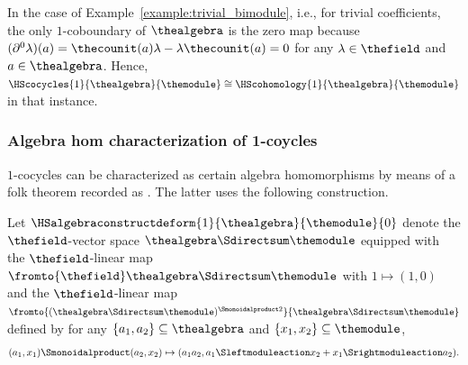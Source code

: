 \documentclass[pdftex]{sigma}
\numberwithin{equation}{section}
\begin{document}
{\begin{Example}
  \label{remark:trivial_bimodule}
  \newcommand{\anyscalar}{\lambda}
  \newcommand{\anyop}{a}
  In the case of Example~\ref{example:trivial_bimodule}, i.e., for trivial coefficients, the only $1$-coboundary of $\thealgebra$ is the zero map because $(\partial^0\anyscalar)(\anyop)=\thecounit(\anyop)\anyscalar-\anyscalar\thecounit(\anyop)=0$ for any $\anyscalar\in\thefield$ and $\anyop\in\thealgebra$. Hence,  $\HScocycles{1}{\thealgebra}{\themodule}\cong\HScohomology{1}{\thealgebra}{\themodule}$ in that instance.
\end{Example}
\subsubsection{Algebra hom characterization of 1-coycles}
\label{section:hochschild-general-algebrahoms}
$1$-cocycles can be characterized as certain algebra homomorphisms by means of  a folk theorem recorded as  \cite[Lemma~1.9]{KyedRaum2017}. The latter uses the following construction.

{
    \newcommand{\thedeform}{c}
  \newcommand{\thedeformxx}[2]{c(#1 \Smonoidalproduct #2)}
  \newcommand{\thirda}{a_3}
        \newcommand{\firsta}{a_1}
      \newcommand{\firstx}{x_1}
      \newcommand{\seconda}{a_2}
      \newcommand{\secondx}{x_2}
      \begin{Definition}
        \label{definition:the-bfg-algebra}
    Let $\HSalgebraconstructdeform{1}{\thealgebra}{\themodule}{0}$ denote the  $\thefield$-vector space $\thealgebra\Sdirectsum\themodule$ equipped with the $\thefield$-linear map $\fromto{\thefield} \thealgebra\Sdirectsum\themodule$ with $1\mapsto (1,0)$ and the $\thefield$-linear map $\fromto{(\thealgebra\Sdirectsum\themodule)^{\Smonoidalproduct 2}}{\thealgebra\Sdirectsum\themodule}$ defined by     for any $\{\firsta,\seconda\}\subseteq \thealgebra$ and $\{\firstx,\secondx\}\subseteq \themodule$,
    \[
      (\firsta,\firstx)\Smonoidalproduct(\seconda,\secondx)\mapsto (\firsta\seconda,\firsta\Sleftmoduleaction\secondx+\firstx\Srightmoduleaction\seconda).
    \]
  \end{Definition}
}


}
\end{document}
